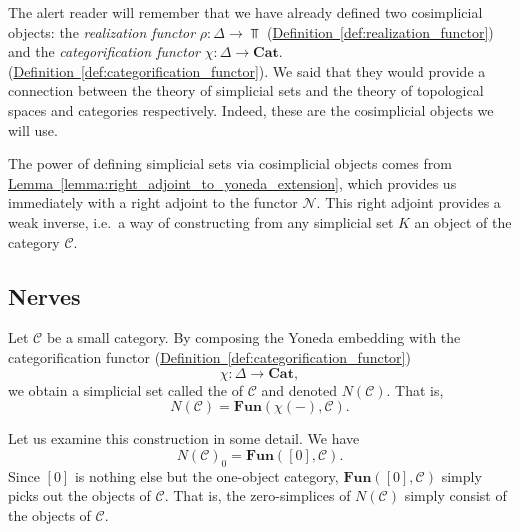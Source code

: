 \documentclass[main.tex]{subfiles}
\begin{document}
The alert reader will remember that we have already defined two cosimplicial objects: the \emph{realization functor} $\rho\colon \Delta \to \Top$ (\hyperref[def:realization_functor]{Definition~\ref*{def:realization_functor}}) and the \emph{categorification functor} $\chi\colon \Delta \to \mathbf{Cat}$. (\hyperref[def:categorification_functor]{Definition~\ref*{def:categorification_functor}}). We said that they would provide a connection between the theory of simplicial sets and the theory of topological spaces and categories respectively. Indeed, these are the cosimplicial objects we will use.

The power of defining simplicial sets via cosimplicial objects comes from \hyperref[lemma:right_adjoint_to_yoneda_extension]{Lemma~\ref*{lemma:right_adjoint_to_yoneda_extension}}, which provides us immediately with a right adjoint to the functor $\mathcal{N}$. This right adjoint provides a weak inverse, i.e.\ a way of constructing from any simplicial set $K$ an object of the category $\mathcal{C}$.

\subsection{Nerves}
\label{ssc:nerves}

\begin{definition}
  \label{def:nerve_of_a_category}
  Let $\mathcal{C}$ be a small category. By composing the Yoneda embedding with the categorification functor (\hyperref[def:categorification_functor]{Definition~\ref*{def:categorification_functor}})
  \begin{equation*}
    \chi\colon \Delta \to \mathbf{Cat},
  \end{equation*}
  we obtain a simplicial set called the  of $\mathcal{C}$ and denoted $N(\mathcal{C})$. That is,
  \begin{equation*}
    N(\mathcal{C}) = \mathbf{Fun}(\chi(-), \mathcal{C}).
  \end{equation*}
\end{definition}

Let us examine this construction in some detail. We have
\begin{equation*}
  N(\mathcal{C})_{0} = \mathbf{Fun}([0], \mathcal{C}).
\end{equation*}
Since $[0]$ is nothing else but the one-object category, $\mathbf{Fun}([0], \mathcal{C})$ simply picks out the objects of $\mathcal{C}$. That is, the zero-simplices of $N(\mathcal{C})$ simply consist of the objects of $\mathcal{C}$.
\end{document}
